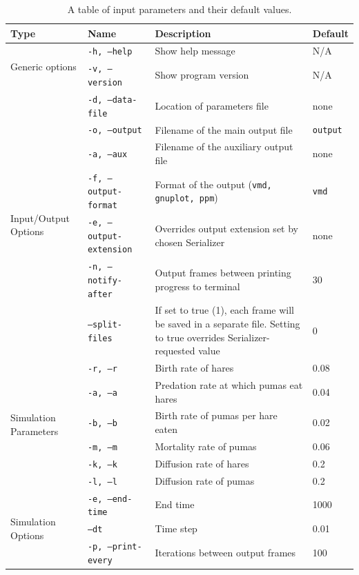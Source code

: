 \documentclass[a4paper,11pt]{article}
\begin{document}
{\begin{table}
\centering
\begin{tabular}{|l|l|l|l|}
\hline
\textbf{Type} & \textbf{Name} & \textbf{Description} & \textbf{Default} \\ \hline
\multirow{2}{*}{Generic options}
 & \texttt{-h, --help} & Show help message  & N/A \\
 & \texttt{-v, --version} & Show program version & N/A \\
\multirow{7}{*}{Input/Output Options} 
 & \texttt{-d, --data-file} & Location of parameters file & none \\
 & \texttt{-o, --output} & Filename of the main output file & \texttt{output} \\
 & \texttt{-a, --aux} & Filename of the auxiliary output file & none \\
 & \texttt{-f, --output-format}  &  Format of the output (\texttt{vmd, gnuplot, ppm}) & \texttt{vmd} \\
 & \texttt{-e, --output-extension} & Overrides output extension set by chosen Serializer & none \\
 & \texttt{-n, --notify-after} & Output frames between printing progress to terminal & 30 \\
 & \texttt{--split-files} & If set to true (1), each frame will be saved in a separate file. Setting to true overrides Serializer-requested value & 0 \\
\multirow{6}{*}{Simulation Parameters} 
 & \texttt{-r, --r} & Birth rate of hares & 0.08 \\
 & \texttt{-a, --a} & Predation rate at which pumas eat hares & 0.04\\
 & \texttt{-b, --b} & Birth rate of pumas per hare eaten & 0.02 \\
 & \texttt{-m, --m} & Mortality rate of pumas & 0.06 \\ 
 & \texttt{-k, --k} & Diffusion rate of hares  & 0.2 \\ 
 & \texttt{-l, --l} & Diffusion rate of pumas & 0.2 \\ \hline
\multirow{3}{*}{Simulation Options} 
 & \texttt{-e, --end-time} & End time & 1000 \\
 & \texttt{--dt} & Time step & 0.01\\
 & \texttt{-p, --print-every} & Iterations between output frames & 100\\ \hline
\hline
\end{tabular}
\caption{A table of input parameters and their default values.}
\label{tb:parameters}
\end{table}

}
\end{document}

